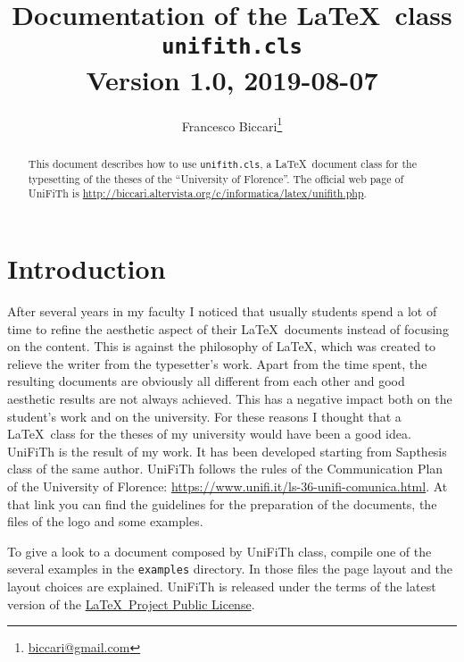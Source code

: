 \documentclass[a5paper,11pt]{article}
\author{\small Francesco Biccari\thanks{\href{mailto:biccari@gmail.com}{biccari@gmail.com}}}
\title{\small Documentation of the \LaTeX\ class\\
		\Large \textbf{\texttt{unifith.cls}}\\
		\small \vspace{0.2cm} Version 1.0, 2019-08-07
}
\date{}
\begin{document}
\maketitle

\begin{abstract}\noindent
This document describes how to use \texttt{unifith.cls}, a \LaTeX\ document class for the typesetting of the theses of the ``University of Florence''. The official web page of \textsf{UniFiTh} is {\footnotesize\url{http://biccari.altervista.org/c/informatica/latex/unifith.php}}.
\end{abstract}

\setcounter{tocdepth}{2}
\renewcommand{\columnseprule}{0.4pt}
\setlength{\columnsep}{1.5cm}

{\small
\tableofcontents}

\clearpage

\section{Introduction}

After several years in my faculty I noticed that usually students spend a lot of time to refine the aesthetic aspect of their \LaTeX\ documents instead of focusing on the content.
This is against the philosophy of \LaTeX, which was created to relieve the writer from the typesetter's work.
Apart from the time spent, the resulting documents are obviously all different from each other and good aesthetic results are not always achieved.
This has a negative impact both on the student's work and on the university.
For these reasons I thought that a \LaTeX\ class for the theses of my 
university would have been a good idea.
\textsf{UniFiTh} is the result of my work.
It has been developed starting from \textsf{Sapthesis} class of the same author. \textsf{UniFiTh} follows the rules of the Communication Plan of the University of Florence: {\footnotesize\url{https://www.unifi.it/ls-36-unifi-comunica.html}}. At that link you can find the guidelines for the preparation of the documents, the files of the logo and some examples. 

To give a look to a document composed by \textsf{UniFiTh} class, compile one of the several examples in the \texttt{examples} directory.
In those files the page layout and the layout choices are explained.
\textsf{UniFiTh} is released under the terms of the latest version of the 
\href{http://www.latex-project.org/lppl/}{\LaTeX\ Project Public License}.
\end{document}
